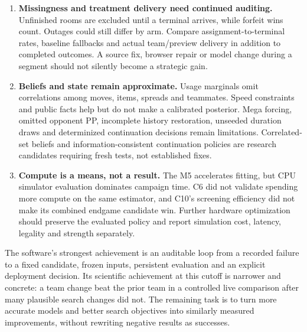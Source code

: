 \begin{enumerate}
 account for repeated looks. A future protocol could preregister block-aware
 inference or anytime-valid confidence sequences and a family-wise error
 budget; those methods are not implemented or retrospectively credited here.
 \item \textbf{Missingness and treatment delivery need continued auditing.}
 Unfinished rooms are excluded until a terminal arrives, while forfeit wins
 count. Outages could still differ by arm. Compare assignment-to-terminal
 rates, baseline fallbacks and actual team/preview delivery in addition to
 completed outcomes. A source fix, browser repair or model change during a
 segment should not silently become a strategic gain.
 \item \textbf{Beliefs and state remain approximate.}
 Usage marginals omit correlations among moves, items, spreads and teammates.
 Speed constraints and public facts help but do not make a calibrated
 posterior. Mega forcing, omitted opponent PP, incomplete history restoration,
 unseeded duration draws and determinized continuation decisions remain
 limitations. Correlated-set beliefs and information-consistent continuation
 policies are research candidates requiring fresh tests, not established fixes.
 \item \textbf{Compute is a means, not a result.}
 The M5 accelerates fitting, but CPU simulator evaluation dominates campaign
 time. C6 did not validate spending more compute on the same estimator, and
 C10's screening efficiency did not make its combined endgame candidate win.
 Further hardware optimization should preserve the evaluated policy and
 report simulation cost, latency, legality and strength separately.
\end{enumerate}

The software's strongest achievement is an auditable loop from a recorded
failure to a fixed candidate, frozen inputs, persistent evaluation and an
explicit deployment decision. Its scientific achievement at this cutoff is
narrower and concrete: a team change beat the prior team in a controlled live
comparison after many plausible search changes did not. The remaining task is
to turn more accurate models and better search objectives into similarly
measured improvements, without rewriting negative results as successes.
